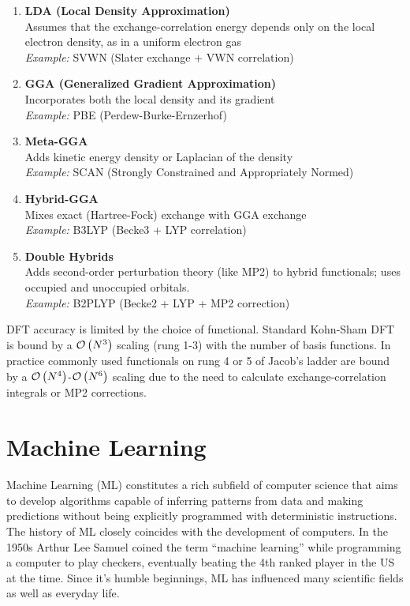 \begin{enumerate}
    \item \textbf{LDA (Local Density Approximation)}\\
    Assumes that the exchange-correlation energy depends only on the local electron density, as in a uniform electron gas\\
    \textit{Example:} SVWN (Slater exchange + VWN correlation) \parencite{ref:slater1951, ref:vwn1980}

    \item \textbf{GGA (Generalized Gradient Approximation)}\\
    Incorporates both the local density and its gradient\\
    \textit{Example:} PBE (Perdew-Burke-Ernzerhof) \parencite{ref:perdew1996}

    \item \textbf{Meta-GGA}\\
    Adds kinetic energy density or Laplacian of the density\\
    \textit{Example:} SCAN (Strongly Constrained and Appropriately Normed) \parencite{ref:scan2015}

    \item \textbf{Hybrid-GGA}\\
    Mixes exact (Hartree-Fock) exchange with GGA exchange\\
    \textit{Example:} B3LYP (Becke3 + LYP correlation) \parencite{ref:lee_yang_parr_1988, ref:becke_1993}

    \item \textbf{Double Hybrids}\\
    Adds second-order perturbation theory (like MP2) to hybrid functionals; uses occupied and unoccupied orbitals.\\
    \textit{Example:} B2PLYP (Becke2 + LYP + MP2 correction) \parencite{ref:grimme2006}
\end{enumerate}
DFT accuracy is limited by the choice of functional. Standard Kohn-Sham DFT is bound by a $\mathcal{O}\left(N^3\right)$ scaling (rung 1-3) with the number of basis functions. In practice commonly used functionals on rung 4 or 5 of Jacob's ladder are bound by a $\mathcal{O}\left(N^4\right)$-$\mathcal{O}\left(N^6\right)$ scaling due to the need to calculate exchange-correlation integrals or MP2 corrections.


\section{Machine Learning}
\label{sec:background_ml}
Machine Learning (ML) constitutes a rich subfield of computer science that aims to develop algorithms capable of inferring patterns from data and making predictions without being explicitly programmed with deterministic instructions. \\
The history of ML closely coincides with the development of computers. In the 1950s Arthur Lee Samuel coined the term ``machine learning'' while programming a computer to play checkers, eventually beating the 4th ranked player in the US at the time. \parencite{ref:knuth1989comments} Since it's humble beginnings, ML has influenced many scientific fields as well as everyday life.\\

